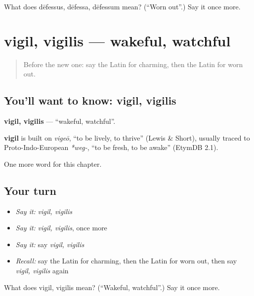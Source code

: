 \begin{tcolorbox}[breakable,colback=teal!4,colframe=teal!35!black,title={Before you move on}]
What does dēfessus, dēfessa, dēfessum mean? (\textquotedblleft{}Worn out\textquotedblright{}.) Say it once more.
\end{tcolorbox}
\section[vigil, vigilis]{vigil, vigilis — wakeful, watchful}

\label{lesson:LA-C216-vigil}



\begin{quote}
Before the new one: say the Latin for charming, then the Latin for worn out.
\end{quote}

\subsection*{You'll want to know: vigil, vigilis}
\textbf{vigil, vigilis} — \textquotedblleft{}wakeful, watchful\textquotedblright{}.

\begin{cousinweb}
\textbf{vigil} is built on \emph{vigeō}, \textquotedblleft{}to be lively, to thrive\textquotedblright{} (Lewis \& Short), usually traced to Proto-Indo-European \emph{*weg-}, \textquotedblleft{}to be fresh, to be awake\textquotedblright{} (EtymDB 2.1).
\end{cousinweb}

\begin{grammarlens}[title={What you've built}]
One more word for this chapter.
\end{grammarlens}

\subsection*{Your turn}
\begin{itemize}
\raggedright
  \item \emph{Say it:} \emph{vigil, vigilis}
  \item \emph{Say it:} \emph{vigil, vigilis}, once more
  \item \emph{Say it:} say \emph{vigil, vigilis}
  \item \emph{Recall:} say the Latin for charming, then the Latin for worn out, then say \emph{vigil, vigilis} again
\end{itemize}

\begin{tcolorbox}[breakable,colback=teal!4,colframe=teal!35!black,title={Before you move on}]
What does vigil, vigilis mean? (\textquotedblleft{}Wakeful, watchful\textquotedblright{}.) Say it once more.
\end{tcolorbox}
